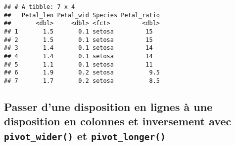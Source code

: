 \documentclass[
  french,
]{book}
\newenvironment{Shaded}{\begin{snugshade}}{\end{snugshade}}
\newcommand{\DataTypeTok}[1]{\textcolor[rgb]{0.13,0.29,0.53}{#1}}
\newcommand{\DecValTok}[1]{\textcolor[rgb]{0.00,0.00,0.81}{#1}}
\newcommand{\KeywordTok}[1]{\textcolor[rgb]{0.13,0.29,0.53}{\textbf{#1}}}
\newcommand{\NormalTok}[1]{#1}
\newcommand{\OperatorTok}[1]{\textcolor[rgb]{0.81,0.36,0.00}{\textbf{#1}}}
\newcommand{\StringTok}[1]{\textcolor[rgb]{0.31,0.60,0.02}{#1}}
\begin{document}
\begin{Shaded}
\end{Shaded}

\begin{verbatim}
## # A tibble: 7 x 4
##   Petal_len Petal_wid Species Petal_ratio
##       <dbl>     <dbl> <fct>         <dbl>
## 1       1.5       0.1 setosa         15  
## 2       1.5       0.1 setosa         15  
## 3       1.4       0.1 setosa         14  
## 4       1.4       0.1 setosa         14  
## 5       1.1       0.1 setosa         11  
## 6       1.9       0.2 setosa          9.5
## 7       1.7       0.2 setosa          8.5
\end{verbatim}

\hypertarget{passer-dune-disposition-en-lignes-uxe0-une-disposition-en-colonnes-et-inversement-avec-pivot_wider-et-pivot_longer}{%
\subsection{\texorpdfstring{Passer d'une disposition en lignes à une disposition en colonnes et inversement avec \texttt{pivot\_wider()} et \texttt{pivot\_longer()}}{Passer d'une disposition en lignes à une disposition en colonnes et inversement avec pivot\_wider() et pivot\_longer()}}\label{passer-dune-disposition-en-lignes-uxe0-une-disposition-en-colonnes-et-inversement-avec-pivot_wider-et-pivot_longer}}
\end{document}
